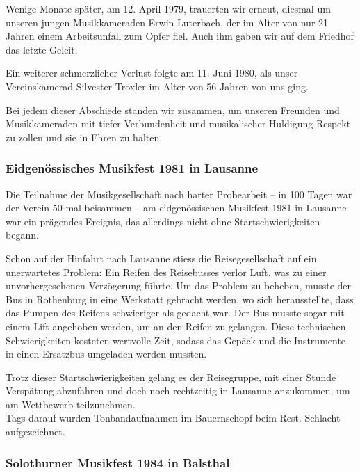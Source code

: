 \begin{history}
    Wenige Monate später, am 12. April 1979, trauerten wir erneut, diesmal um
    unseren jungen Musikkameraden Erwin Luterbach, der im Alter von nur 21
    Jahren einem Arbeitsunfall zum Opfer fiel. Auch ihm gaben wir auf dem
    Friedhof das letzte Geleit.

    Ein weiterer schmerzlicher Verlust folgte am 11. Juni 1980, als unser
    Vereinskamerad Silvester Troxler im Alter von 56 Jahren von uns ging.

    Bei jedem dieser Abschiede standen wir zusammen, um unseren Freunden und
    Musikkameraden mit tiefer Verbundenheit und musikalischer Huldigung Respekt
    zu zollen und sie in Ehren zu halten.

    \subsubsection{Eidgenössisches Musikfest 1981 in Lausanne}

    Die Teilnahme der Musikgesellschaft nach harter Probearbeit -- in 100 Tagen
    war der Verein 50-mal beisammen -- am eidgenössischen Musikfest 1981 in
    Lausanne war ein prägendes Ereignis, das allerdings nicht ohne
    Startschwierigkeiten begann.

    Schon auf der Hinfahrt nach Lausanne stiess die Reisegesellschaft auf ein
    unerwartetes Problem: Ein Reifen des Reisebusses verlor Luft, was zu einer
    unvorhergesehenen Verzögerung führte. Um das Problem zu beheben, musste der
    Bus in Rothenburg in eine Werkstatt gebracht werden, wo sich herausstellte,
    dass das Pumpen des Reifens schwieriger als gedacht war. Der Bus musste
    sogar mit einem Lift angehoben werden, um an den Reifen zu gelangen. Diese
    technischen Schwierigkeiten kosteten wertvolle Zeit, sodass das Gepäck und
    die Instrumente in einen Ersatzbus umgeladen werden mussten.

    Trotz dieser Startschwierigkeiten gelang es der Reisegruppe, mit einer
    Stunde Verspätung abzufahren und doch noch rechtzeitig in Lausanne
    anzukommen, um am Wettbewerb teilzunehmen.\\

    Tags darauf wurden Tonbandaufnahmen im Bauernschopf beim Rest. Schlacht
    aufgezeichnet.


    \subsubsection{Solothurner Musikfest 1984 in Balsthal}


\end{history}
